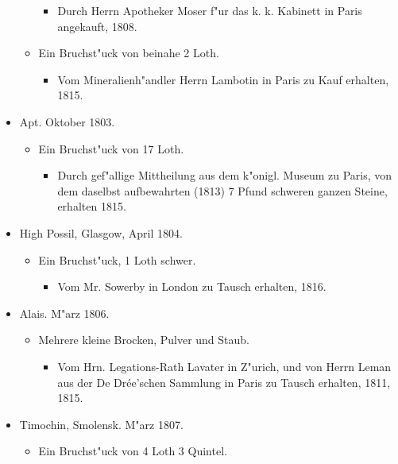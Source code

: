 \documentclass[a4paper, 11pt, oneside, polutonikogreek, german]{article}
\begin{document}
\begin{itemize}
\begin{itemize}
        \begin{itemize}
            \item Durch Herrn Apotheker Moser f"ur das k. k. Kabinett in Paris angekauft, 1808.
        \end{itemize}
        \item Ein Bruchst"uck von beinahe 2 Loth.
        \begin{itemize}
            \item Vom Mineralienh"andler Herrn Lambotin in Paris zu Kauf erhalten, 1815.
        \end{itemize}
    \end{itemize}
    \item Apt. Oktober 1803.
    \begin{itemize}
        \item Ein Bruchst"uck von 17 Loth.
        \begin{itemize}
            \item Durch gef"allige Mittheilung aus dem k"onigl. Museum zu Paris, von dem daselbst aufbewahrten (1813) 7 Pfund schweren ganzen Steine, erhalten 1815.
        \end{itemize}
    \end{itemize}
    \item High Possil, Glasgow, April 1804.
    \begin{itemize}
        \item Ein Bruchst"uck, 1 Loth schwer.
        \begin{itemize}
            \item Vom Mr. Sowerby in London zu Tausch erhalten, 1816.
        \end{itemize}
    \end{itemize}
    \item Alais. M"arz 1806.
    \begin{itemize}
        \item Mehrere kleine Brocken, Pulver und Staub.
        \begin{itemize}
            \item Vom Hrn. Legations-Rath Lavater in Z"urich, und von Herrn Leman aus der De Drée'schen Sammlung in Paris zu Tausch erhalten, 1811, 1815.
        \end{itemize}
    \end{itemize}
    \item Timochin, Smolensk. M"arz 1807.
    \begin{itemize}
        \item Ein Bruchst"uck von 4 Loth 3 Quintel.

\end{itemize}
\end{itemize}
\end{document}
